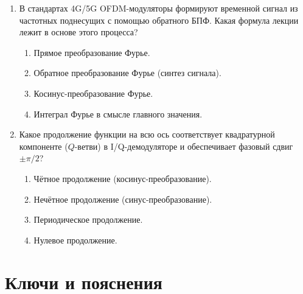\documentclass[12pt,a4paper]{article}
\begin{document}
\begin{enumerate}[label=\textbf{3.\arabic*.}]
    \item В стандартах 4G/5G OFDM-модуляторы формируют временной сигнал из частотных поднесущих с помощью обратного БПФ. Какая формула лекции лежит в основе этого процесса?
    \begin{enumerate}[label=\alph*)]
        \item Прямое преобразование Фурье.
        \item Обратное преобразование Фурье (синтез сигнала).
        \item Косинус-преобразование Фурье.
        \item Интеграл Фурье в смысле главного значения.
    \end{enumerate}

    \item Какое продолжение функции на всю ось соответствует квадратурной компоненте ($Q$-ветви) в I/Q-демодуляторе и обеспечивает фазовый сдвиг $\pm \pi/2$?
    \begin{enumerate}[label=\alph*)]
        \item Чётное продолжение (косинус-преобразование).
        \item Нечётное продолжение (синус-преобразование).
        \item Периодическое продолжение.
        \item Нулевое продолжение.
    \end{enumerate}
\end{enumerate}

\section*{Ключи и пояснения}
\end{document}
